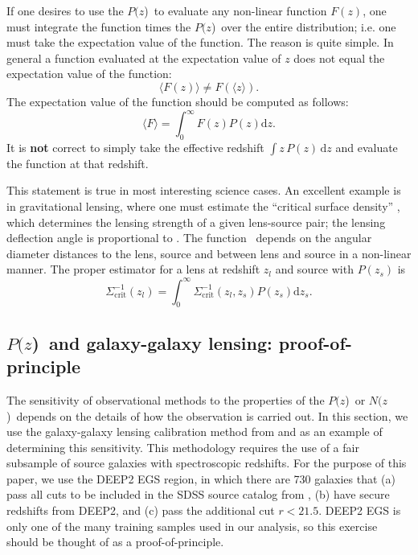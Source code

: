 \documentclass[preprint]{aastex}
\newcommand{\pofz}{$P(z$)}
\newcommand{\nofz}{$N(z$)}
\begin{document}
If one desires to use the \pofz\ to evaluate any non-linear function $F(z)$,
one must integrate the function times the \pofz\ over the entire distribution;
i.e. one must take the expectation value of the function.  The reason is quite
simple. In general a function evaluated at the expectation value of $z$ does not
equal the expectation value of the function:
\begin{equation}
\langle F(z) \rangle \ne F(\langle z \rangle).
\end{equation}
The expectation value of the function should be computed as follows:
\begin{equation}
\langle F \rangle = \int_{0}^{\infty} F(z) P(z) \mathrm{d}z.
\end{equation}
It is {\bf not} correct to simply take the effective redshift $\int
z\,P(z)\,\mathrm{d}z$ and evaluate
the function at that redshift.

This statement is true in most interesting science cases.  An excellent example is in
gravitational lensing, where one must estimate the ``critical surface density''
\sigmacrit, which determines the lensing strength of a given lens-source pair; the
lensing deflection angle is proportional to \scinv.  The function
\sigmacrit\ depends on the angular diameter distances to the lens, source and
between lens and source in a non-linear manner.  The proper estimator for a lens
at redshift $z_{l}$ and source with $P(z_s)$ is
\begin{equation} \label{eq:calcscrit}
\Sigma^{-1}_{\mathrm{crit}}(z_l) = 
    \int_{0}^{\infty} \Sigma_{\mathrm{crit}}^{-1}(z_l, z_s) P(z_s) \mathrm{d}z_s.
\end{equation}


\subsection{\pofz\ and galaxy-galaxy lensing: proof-of-principle} \label{sec:pofp}

The sensitivity of observational methods to the properties of the
\pofz\ or \nofz\ depends on the details of how the observation is
carried out.  In
this section, we use the galaxy-galaxy lensing calibration method from
\cite{man08} and \citet{Nakajima11} as an example of determining this
sensitivity.  This methodology requires the use of a fair subsample of
source galaxies with spectroscopic redshifts.  For the purpose of this
paper, we use the DEEP2 EGS region, in which there are 730 galaxies
that (a) pass all cuts to be included in the SDSS source catalog from
\citet{MandelbaumSystematics05}, (b) have secure redshifts from DEEP2,
and (c) pass the additional cut $r<21.5$. 
DEEP2 EGS is only one of the many training samples used in our
analysis, 
so this exercise should be thought of as a proof-of-principle.
\end{document}
